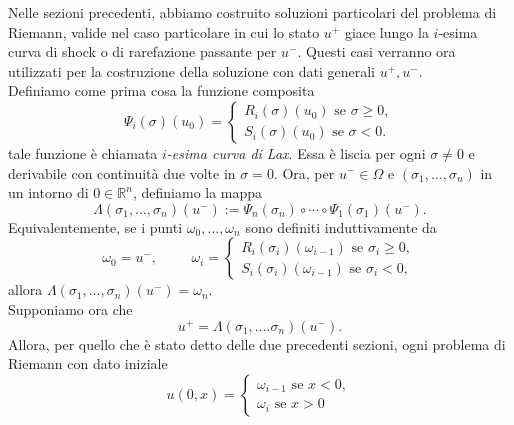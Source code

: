 Nelle sezioni precedenti, abbiamo costruito soluzioni particolari del problema di Riemann, valide nel caso particolare in cui lo stato $u^{+}$ giace lungo la $i$-esima curva di shock o di rarefazione passante per $u^{-}$. Questi casi verranno ora utilizzati per la costruzione della soluzione con dati generali $u^{+}, u^{-}$.\\
Definiamo come prima cosa la funzione composita
\begin{equation}\label{eq:2.68}
    \Psi_{i}(\sigma)(u_{0})=
    \begin{cases}
        R_{i}(\sigma)(u_{0})\text{ se }\sigma\geq 0,\\
        S_{i}(\sigma)(u_{0})\text{ se }\sigma <0.
    \end{cases}
\end{equation}
tale funzione è chiamata \textit{$i$-esima curva di Lax}. Essa è liscia per ogni $\sigma\neq 0$ e derivabile con continuità due volte in $\sigma =0$. Ora, per $u^{-}\in\Omega$ e $(\sigma_{1},\ldots,\sigma_{n})$ in un intorno di $0\in\mathbb{R}^{n}$, definiamo la mappa
\begin{equation}\label{eq:2.69}
    \Lambda (\sigma_{1},\ldots,\sigma_{n})(u^{-}):=\Psi_{n}(\sigma_{n})\circ\cdots\circ\Psi_{1}(\sigma_{1})(u^{-}).
\end{equation}
Equivalentemente, se i punti $\omega_{0},\ldots,\omega_{n}$ sono definiti induttivamente da
\begin{equation}\label{eq:2.70}
    \omega_{0}=u^{-},\hspace{1cm}\omega_{i}=
    \begin{cases}
        R_{i}(\sigma_{i})(\omega_{i-1})\text{ se }\sigma_{i}\geq 0,\\
        S_{i}(\sigma_{i})(\omega_{i-1})\text{ se }\sigma_{i} <0,
    \end{cases}
\end{equation}
allora $\Lambda(\sigma_{1},\ldots,\sigma_{n})(u^{-})=\omega_{n}$.\\
Supponiamo ora che 
\begin{equation*}
    u^{+}=\Lambda(\sigma_{1},\ldots.\sigma_{n})(u^{-}).
\end{equation*}
Allora, per quello che è stato detto delle due precedenti sezioni, ogni problema di Riemann con dato iniziale
\begin{equation}\label{eq:2.71}
    u(0,x)=
    \begin{cases}
        \omega_{i-1}\text{ se }x<0,\\
        \omega_{i}\text{ se }x>0
    \end{cases}
\end{equation}
